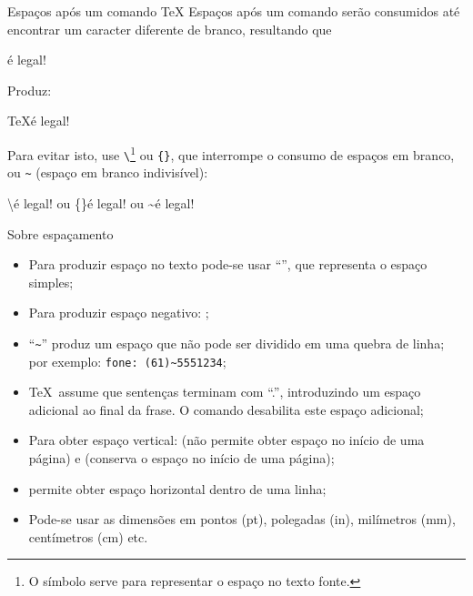 \begin{frame}{Espaços após um comando \TeX}
	Espaços após um comando serão consumidos até encontrar um caracter diferente de branco, resultando que
	\pause
		\begin{Codigo}{}
			 é legal!
		\end{Codigo}
		
	\pause
	Produz:
	
		\begin{Resultado}{}
			\TeX é legal!
		\end{Resultado}
	\pause
	Para evitar isto, use \texttt{\textbackslash\textvisiblespace}\footnote{O símbolo \texttt{\textvisiblespace}  serve para representar o espaço no texto fonte.} ou \texttt{\{\}}, que interrompe o consumo de espaços em branco, ou \texttt{\textasciitilde} (espaço em branco indivisível):

	\pause
	\begin{Codigo}{}
		\textbackslash\textvisiblespace é legal!\n
		ou\n
		\{\}\textvisiblespace é legal!\n
		ou\n
		\textasciitilde é legal!
	\end{Codigo}
\end{frame}

\begin{frame}{Sobre espaçamento}\fontsize{10}{12}\selectfont
	\begin{itemize}
		\item Para produzir espaço no texto pode-se usar ``\LCmd{\textvisiblespace}'', que representa o espaço simples;
		\pause
		\item Para produzir espaço negativo: \texttt{\string\!};
		\pause
		\item ``\texttt{\textasciitilde}'' produz um espaço que não pode ser dividido em uma quebra de linha; por exemplo: \texttt{fone:\ (61)\textasciitilde5551234};
		\pause
		\item \TeX\ assume que sentenças terminam com ``.'', introduzindo um espaço adicional ao final da frase. O comando  desabilita este espaço adicional;
		\pause
		\item Para obter espaço vertical:  (não permite obter espaço no início de uma página) e  (conserva o espaço no início de uma página);
		\pause
		\item {} permite obter espaço horizontal dentro de uma linha;
		\pause
		\item Pode-se usar as dimensões em pontos (pt), polegadas (in), milímetros (mm), centímetros (cm) etc.
	\end{itemize}
\end{frame}

